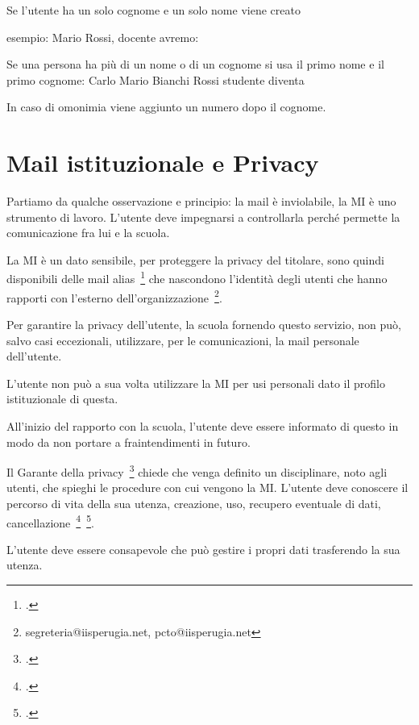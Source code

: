 Se l'utente ha un solo cognome e un solo nome viene creato
\begin{center}
\end{center}
esempio: Mario Rossi, docente avremo:
\begin{center}
\end{center}
Se una persona ha più di un nome o di un cognome si usa il primo nome e il  
primo cognome: Carlo Mario Bianchi Rossi studente diventa
\begin{center}
\end{center}
In caso di omonimia viene aggiunto un numero dopo il cognome.
\section{Mail istituzionale e Privacy}
Partiamo da qualche osservazione e principio: la mail è inviolabile, la 
MI è uno strumento di lavoro. L'utente deve impegnarsi a controllarla perché  permette la comunicazione fra lui e la scuola. 

La MI è 
un dato sensibile, per proteggere la privacy del titolare,  sono quindi 
disponibili delle mail alias~\footcite{Garante2007} che nascondono l'identità degli utenti 
che  hanno rapporti 
con l'esterno dell'organizzazione~\footnote{segreteria@iisperugia.net, pcto@iisperugia.net}. 

Per garantire la privacy dell'utente, la scuola fornendo questo servizio, non può, salvo casi eccezionali, utilizzare, per le comunicazioni, 
la mail personale dell'utente.

L'utente non può a sua volta utilizzare la MI per  usi  
personali dato il profilo istituzionale di questa. 

 All'inizio del rapporto con la scuola, l'utente deve essere informato di questo 
in modo da non portare a fraintendimenti in futuro.

Il Garante della privacy~\footcite{Garante2007} chiede che 
venga definito un disciplinare, noto agli utenti, che spieghi le procedure con cui vengono la MI. 
L'utente deve conoscere il percorso di vita della sua utenza, creazione, uso, 
recupero eventuale di dati, 
cancellazione~\footcite{Garante2007}~\footcite{Garante2019}. 

L'utente deve 
essere consapevole che 
può gestire i propri dati trasferendo  la sua utenza. 

